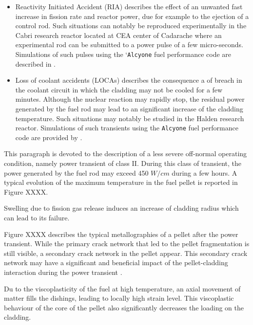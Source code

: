 \begin{itemize}
    \item Reactivity Initiated Accident (RIA) describes the effect of an
    unwanted fast increase in fission rate and reactor power, due for
    example to the ejection of a control rod. Such situations can notably
    be reproduced experimentally in the Cabri research reactor located at
    CEA center of Cadarache where an experimental rod can be submitted to
    a power pulse of a few micro-seconds. Simulations of such pulses using
    the `\texttt{Alcyone} fuel performance code are described in
    \cite{guenot-delahaie_simulation_2017}.
    \item Loss of coolant accidents (LOCAs) describes the consequence a of
    breach in the coolant circuit in which the cladding may not be cooled
    for a few minutes. Although the nuclear reaction may rapidly stop, the
    residual power generated by the fuel rod may lead to an significant
    increase of the cladding temperature. Such situations may notably be
    studied in the Halden research reactor. Simulations of such transients
    using the \texttt{Alcyone} fuel performance code are provided by
    \cite{struzik_simulation_2017}.
\end{itemize}

This paragraph is devoted to the description of a less severe off-normal
operating condition, namely power transient of class II. During this
class of transient, the power generated by the fuel rod may exceed
450 $W/cm$ during a few hours. A typical evolution of the
maximum temperature in the fuel pellet is reported in Figure
XXXX.

Swelling due to fission gas release induces an increase of cladding
radius which can lead to its failure.


Figure XXXX describes the typical metallographies of
a pellet after the power transient. While the primary crack network that
led to the pellet fragmentation is still visible, a secondary crack
network in the pellet appear. This secondary crack network may have a
significant and beneficial impact of the pellet-cladding interaction
during the power transient \cite{michel_3d_2008}.

Du to the viscoplasticity of the fuel at high temperature, an axial
movement of matter fills the dishings, leading to locally high strain
level. This viscoplastic behaviour of the core of the pellet also
significantly decreases the loading on the cladding.

